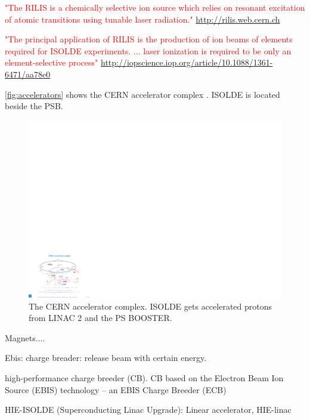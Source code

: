 \documentclass[twoside,english]{uiofysmaster/uiofysmaster}
\begin{document}
\bigskip


\textcolor{red}{"The RILIS is a chemically selective ion source which relies on resonant excitation of atomic transitions using tunable laser radiation." \url{http://rilis.web.cern.ch}} 

\textcolor{red}{"The principal application of RILIS is the production of ion beams of elements required for ISOLDE experiments. ... laser ionization is required to be only an element-selective process"} \url{http://iopscience.iop.org/article/10.1088/1361-6471/aa78e0}

\bigskip

\autoref{fig:accelerators} shows the CERN accelerator complex \cite{CERN-AC}. ISOLDE is located beside the PSB.


\begin{figure}[t]
	\centering
	\includegraphics[width=\textwidth]{images/0812015.pdf}
	\caption{The CERN accelerator complex. ISOLDE gets accelerated protons from LINAC 2 and the PS BOOSTER.}
	\label{fig:accelerators}
\end{figure}

\bigskip

Magnets....

\bigskip

Ebis: charge breader: release beam with certain energy.


high-performance charge breeder (CB). CB based on the Electron Beam Ion Source (EBIS) technology – an EBIS Charge Breeder (ECB)


\bigskip

HIE-ISOLDE (Superconducting Linac Upgrade): Linear accelerator, HIE-linac \newline
\end{document}
